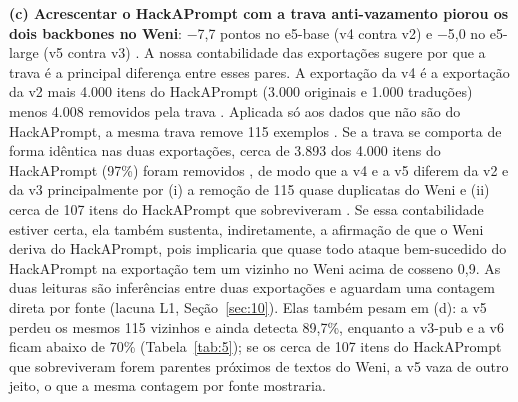 \documentclass[11pt]{article}
\begin{document}
\textbf{(c) Acrescentar o HackAPrompt com a trava anti-vazamento piorou os dois backbones no Weni}: \ensuremath{-}7,7 pontos no e5-base (v4 contra v2) e \ensuremath{-}5,0 no e5-large (v5 contra v3)%
. A nossa contabilidade das exportações sugere por que a trava é a principal diferença entre esses pares. A exportação da v4 é a exportação da v2 mais 4.000 itens do HackAPrompt (3.000 originais e 1.000 traduções) %
menos 4.008 removidos pela trava%
. Aplicada só aos dados que não são do HackAPrompt, a mesma trava remove 115 exemplos%
. Se a trava se comporta de forma idêntica nas duas exportações, cerca de 3.893 dos 4.000 itens do HackAPrompt (97\%) foram removidos%
, de modo que a v4 e a v5 diferem da v2 e da v3 principalmente por (i) a remoção de 115 quase duplicatas do Weni e (ii) cerca de 107 itens do HackAPrompt que sobreviveram%
. Se essa contabilidade estiver certa, ela também sustenta, indiretamente, a afirmação de que o Weni deriva do HackAPrompt, pois implicaria que quase todo ataque bem-sucedido do HackAPrompt na exportação tem um vizinho no Weni acima de cosseno 0,9. As duas leituras são inferências entre duas exportações e aguardam uma contagem direta por fonte (lacuna L1, Seção~\ref{sec:10}). Elas também pesam em (d): a v5 perdeu os mesmos 115 vizinhos e ainda detecta 89,7\%, enquanto a v3-pub e a v6 ficam abaixo de 70\% (Tabela~\ref{tab:5}); se os cerca de 107 itens do HackAPrompt que sobreviveram forem parentes próximos de textos do Weni, a v5 vaza de outro jeito, o que a mesma contagem por fonte mostraria.
\end{document}
